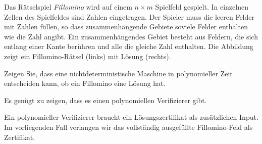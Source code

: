 Das Rätselspiel {\it Fillomino} wird auf einem $n\times m$ Spielfeld 
gespielt. In einzelnen Zellen des Spielfeldes sind Zahlen eingetragen.
Der Spieler muss die leeren Felder mit Zahlen füllen, so dass
zusammenhängende Gebiete soviele Felder enthalten
wie die Zahl angibt. Ein zusammenhängendes Gebiet besteht aus Feldern,
die sich entlang einer Kante berühren und alle die gleiche Zahl enthalten.
Die Abbildung zeigt ein Fillomino-Rätsel (links) mit Lösung (rechts).
\begin{center}
\qquad
{}
\end{center}
Zeigen Sie, dass eine nichtdeterministische Maschine in polynomieller
Zeit entscheiden kann, ob ein Fillomino eine Lösung hat.

\begin{loesung}
Es genügt zu zeigen, dass es einen polynomiellen Verifizierer gibt.

Ein polynomieller Verifizierer braucht ein Lösungszertifikat als 
zusätzlichen Input. Im vorliegenden Fall verlangen wir das vollständig
ausgefüllte Fillomino-Feld als Zertifikat.


\end{loesung}
